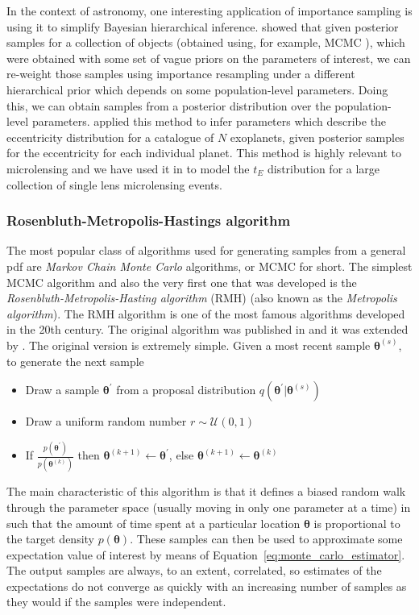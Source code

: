 \documentclass[12pt,dvipsnames]{report}
\renewcommand{\vec}[1]{\boldsymbol{\mathbf{#1}}}
\begin{document}
In the context of astronomy, one  interesting 
application of importance sampling is using it to simplify Bayesian hierarchical 
inference. \citet{2010ApJ...725.2166H} showed that given posterior samples for a 
collection of objects (obtained using, for example, MCMC ), which were obtained with some 
set of vague priors on the parameters of interest, we can re-weight those samples using 
importance resampling under a different hierarchical prior which depends on some 
population-level parameters. Doing this, we can obtain samples from a posterior 
distribution over the population-level parameters. 
\citet{2010ApJ...725.2166H} applied this method to infer parameters which 
describe the eccentricity  distribution for a catalogue of $N$ exoplanets, given 
posterior samples for the eccentricity for each individual planet. 
This method is highly relevant to microlensing and we have used it in \citet{golovich2022}
to model the $t_E$ distribution for a large collection of single lens microlensing 
events. 

\subsubsection{Rosenbluth-Metropolis-Hastings algorithm}
The most popular class of algorithms used for generating samples 
from a general pdf are 
\emph{Markov Chain Monte Carlo} algorithms, or MCMC for short. The simplest 
MCMC algorithm and also the very first one that was developed is the
\emph{Rosenbluth-Metropolis-Hasting algorithm} (RMH) (also known as the 
\emph{Metropolis algorithm}). The RMH algorithm is one of 
the most famous algorithms developed in the 20th century. The original algorithm was 
published in \citet{1953JChPh..21.1087M} and it was extended by 
\citet{1970Bimka..57...97H}. The original version is extremely simple. 
Given a most recent sample $\vec\theta^{(s)}$, to generate the next sample
\begin{itemize}
    \item Draw a sample $\vec{\theta}^\prime$ from a proposal distribution $q(\bm\theta^\prime\lvert\vec\theta^{(s)})$ 
    \item Draw a uniform random number $r\sim\mathcal{U}(0,1)$
    \item If $\frac{p(\bm\theta^\prime)}{p(\vec\theta^{(k)})}$ then $\bm\theta^{(k+1)}\leftarrow \bm\theta^\prime$, else $\bm\theta^{(k+1)}\leftarrow\bm\theta^{(k)}$
\end{itemize}
The main characteristic of this algorithm is that it defines a biased random walk
through the parameter space (usually moving in only one parameter at a time) 
in such that the amount of time spent at a particular location $\vec\theta$ is 
proportional to the target density $p(\vec\theta)$.
These samples can then be used to approximate some expectation value of interest 
by means of Equation~\ref{eq:monte_carlo_estimator}. The output samples are always, 
to an extent, correlated, so estimates of the expectations do not converge as 
quickly with an increasing number of samples as they would if the samples were independent.
\end{document}
